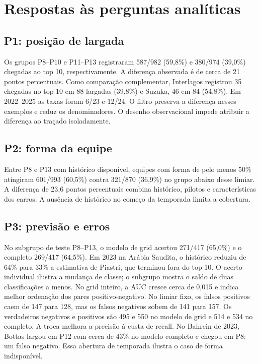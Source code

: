 \documentclass[conference,a4paper]{IEEEtran}
\begin{document}
\section{Respostas às perguntas analíticas}
\subsection{P1: posição de largada}
Os grupos P8--P10 e P11--P13 registraram 587/982 (59,8\%) e 380/974 (39,0\%) chegadas ao top 10, respectivamente. A diferença observada é de cerca de 21 pontos percentuais. Como comparação complementar, Interlagos registrou 35 chegadas no top 10 em 88 largadas (39,8\%) e Suzuka, 46 em 84 (54,8\%). Em 2022--2025 as taxas foram 6/23 e 12/24. O filtro preserva a diferença nesses exemplos e reduz os denominadores. O desenho observacional impede atribuir a diferença ao traçado isoladamente.
\subsection{P2: forma da equipe}
Entre P8 e P13 com histórico disponível, equipes com forma de pelo menos 50\% atingiram 601/993 (60,5\%) contra 321/870 (36,9\%) no grupo abaixo desse limiar. A diferença de 23,6 pontos percentuais combina histórico, pilotos e características dos carros. A ausência de histórico no começo da temporada limita a cobertura.
\subsection{P3: previsão e erros}
No subgrupo de teste P8--P13, o modelo de grid acertou 271/417 (65,0\%) e o completo 269/417 (64,5\%). Em 2023 na Arábia Saudita, o histórico reduziu de 64\% para 33\% a estimativa de Piastri, que terminou fora do top 10. O acerto individual ilustra a mudança de classe; o subgrupo mostra o saldo de duas classificações a menos. No grid inteiro, a AUC cresce cerca de 0,015 e indica melhor ordenação dos pares positivo-negativo. No limiar fixo, os falsos positivos caem de 147 para 128, mas os falsos negativos sobem de 141 para 157. Os verdadeiros negativos e positivos são 495 e 550 no modelo de grid e 514 e 534 no completo. A troca melhora a precisão à custa de recall. No Bahrein de 2023, Bottas largou em P12 com cerca de 43\% no modelo completo e chegou em P8: um falso negativo. Essa abertura de temporada ilustra o caso de forma indisponível.
\end{document}
